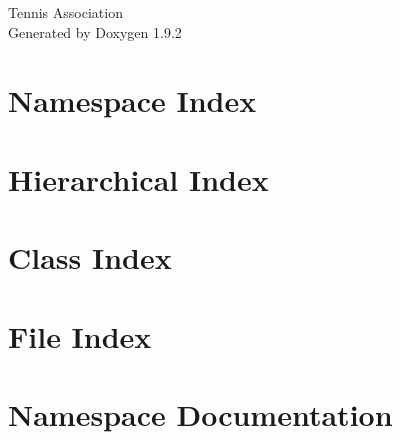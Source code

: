 \documentclass[twoside]{book}
\newcommand{\+}{\discretionary{\mbox{\scriptsize$\hookleftarrow$}}{}{}}
\newcommand{\clearemptydoublepage}{%
    \newpage{\pagestyle{empty}\cleardoublepage}%
  }
\begin{document}
  \raggedbottom
    \hypersetup{pageanchor=false,
                bookmarksnumbered=true,
                pdfencoding=unicode
               }
  \begin{titlepage}
  \vspace*{7cm}
  \begin{center}%
  {\Large Tennis Association}\\
  \vspace*{1cm}
  {\large Generated by Doxygen 1.9.2}\\
  \end{center}
  \end{titlepage}
  \clearemptydoublepage
  \tableofcontents
  \clearemptydoublepage
  \hypersetup{pageanchor=true}
\chapter{Namespace Index}

\chapter{Hierarchical Index}

\chapter{Class Index}

\chapter{File Index}

\chapter{Namespace Documentation}






\end{document}
